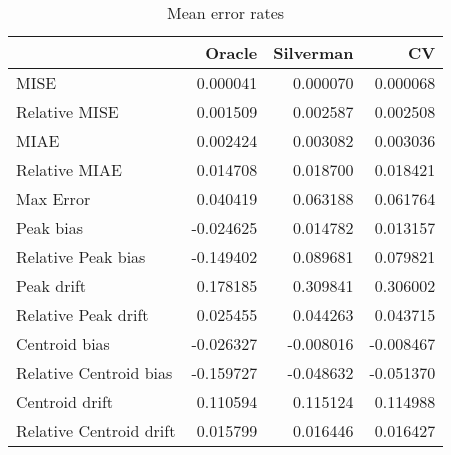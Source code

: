 \begin{table}[H]
\centering
\begin{tabular}{lrrr}
  \hline
 & Oracle & Silverman & CV \\ 
  \hline
MISE & 0.000041 & 0.000070 & 0.000068 \\ 
  Relative MISE & 0.001509 & 0.002587 & 0.002508 \\ 
  MIAE & 0.002424 & 0.003082 & 0.003036 \\ 
  Relative MIAE & 0.014708 & 0.018700 & 0.018421 \\ 
  Max Error & 0.040419 & 0.063188 & 0.061764 \\ 
  Peak bias & -0.024625 & 0.014782 & 0.013157 \\ 
  Relative Peak bias & -0.149402 & 0.089681 & 0.079821 \\ 
  Peak drift & 0.178185 & 0.309841 & 0.306002 \\ 
  Relative Peak drift & 0.025455 & 0.044263 & 0.043715 \\ 
  Centroid bias & -0.026327 & -0.008016 & -0.008467 \\ 
  Relative Centroid bias & -0.159727 & -0.048632 & -0.051370 \\ 
  Centroid drift & 0.110594 & 0.115124 & 0.114988 \\ 
  Relative Centroid drift & 0.015799 & 0.016446 & 0.016427 \\ 
   \hline
\end{tabular}
\caption{Mean error rates} 
\label{tbl:mean_error_rates}
\end{table}
